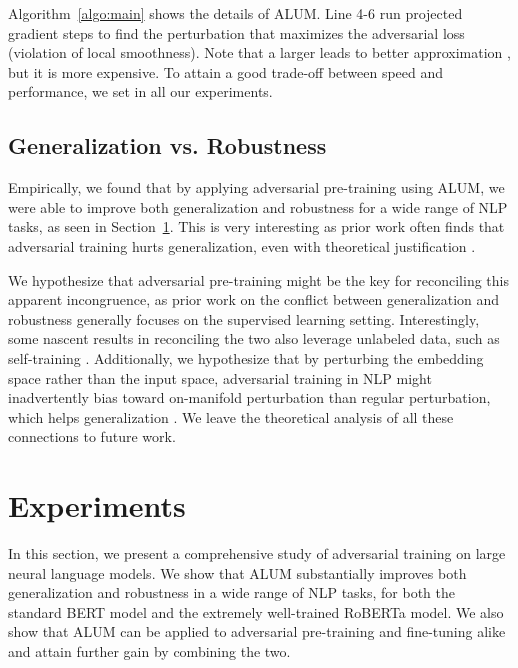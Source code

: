\documentclass[11pt,a4paper]{article}
\newcommand\DNAME{ALUM}
\begin{document}
Algorithm~\ref{algo:main} shows the details of {\DNAME}. Line 4-6 run  projected gradient steps to find the perturbation  that maximizes the adversarial loss (violation of local smoothness). Note that a larger  leads to better approximation \cite{madry2017pgd,qin2019adversarial}, but it is more expensive. To attain a good trade-off between speed and performance, we set  in all our experiments. 

\subsection{Generalization vs. Robustness}
Empirically, we found that by applying adversarial pre-training using {\DNAME}, we were able to improve both generalization and robustness for a wide range of NLP tasks, as seen in Section~\ref{sec:exp}. 
This is very interesting as prior work often finds that adversarial training hurts generalization, even with theoretical justification \cite{raghunathan2019adv-hurt,raghunathan2020understanding,min2020curious}. 

We hypothesize that adversarial pre-training might be the key for reconciling this apparent incongruence, as prior work on the conflict between generalization and robustness generally focuses on the supervised learning setting. Interestingly, some nascent results in reconciling the two also leverage unlabeled data, such as self-training \cite{raghunathan2020understanding}.
Additionally, we hypothesize that by perturbing the embedding space rather than the input space, adversarial training in NLP might inadvertently bias toward on-manifold perturbation than regular perturbation, which helps generalization \cite{stutz2019disentangling}. 
We leave the theoretical analysis of all these connections to future work.





 

\section{Experiments}
\label{sec:exp}
\vspace{-2mm}
In this section, we present a comprehensive study of adversarial training on large neural language models. We show that {\DNAME} substantially improves both generalization and robustness in a wide range of NLP tasks, for both the standard BERT model and the extremely well-trained RoBERTa model. We also show that {\DNAME} can be applied to adversarial pre-training and fine-tuning alike and attain further gain by combining the two.
\end{document}
